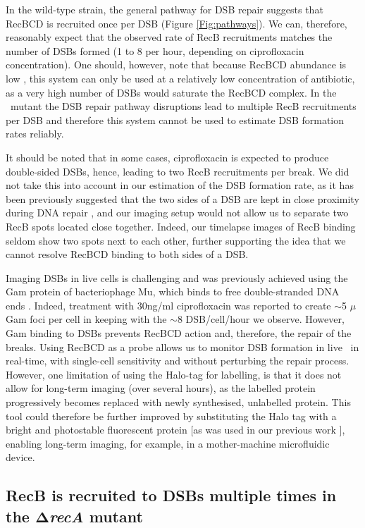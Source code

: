 In the wild-type strain, the general pathway for DSB repair suggests that RecBCD is recruited once per DSB (Figure \ref{Fig:pathways}). We can, therefore, reasonably expect that the observed rate of RecB recruitments matches the number of DSBs formed (1 to 8 per hour, depending on ciprofloxacin concentration). One should, however, note that because RecBCD abundance is low \cite{Lepore2019a}, this system can only be used at a relatively low concentration of antibiotic, as a very high number of DSBs would saturate the RecBCD complex. In the \dreca\ mutant the DSB repair pathway disruptions lead to multiple RecB recruitments per DSB and therefore this system cannot be used to estimate DSB formation rates reliably. 

It should be noted that in some cases, ciprofloxacin is expected to produce double-sided DSBs, hence, leading to two RecB recruitments per break. We did not take this into account in our estimation of the DSB formation rate, as it has been previously suggested that the two sides of a DSB are kept in close proximity during DNA repair \cite{Vickridge2017,Keyamura2019}, and our imaging setup would not allow us to separate two RecB spots located close together. Indeed, our timelapse images of RecB binding seldom show two spots next to each other, further supporting the idea that we cannot resolve RecBCD binding to both sides of a DSB.

Imaging DSBs in live cells is challenging and was previously achieved using the Gam protein of bacteriophage Mu, which binds to free double-stranded DNA ends \cite{Shee2013,Pribis2019,Henrikus2020}. Indeed, treatment with 30ng/ml ciprofloxacin was reported to create $\sim$5 $\mu$Gam foci per cell in keeping with the $\sim$8 DSB/cell/hour we observe. However, Gam binding to DSBs prevents RecBCD action and, therefore, the repair of the breaks. Using RecBCD as a probe allows us to monitor DSB formation in live \ecoli\ in real-time, with single-cell sensitivity and without perturbing the repair process. However, one limitation of using the Halo-tag for labelling, is that it does not allow for long-term imaging (over several hours), as the labelled protein progressively becomes replaced with newly synthesised, unlabelled protein. This tool could therefore be further improved by substituting the Halo tag with a bright and photostable fluorescent protein [as was used in our previous work \cite{Lepore2019a}], enabling long-term imaging, for example, in a mother-machine microfluidic device.

\subsection*{RecB is recruited to DSBs multiple times in the $\mathbf{\Delta}$\emph{recA} mutant}

